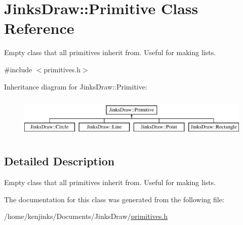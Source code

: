 \hypertarget{class_jinks_draw_1_1_primitive}{}\section{Jinks\+Draw\+:\+:Primitive Class Reference}
\label{class_jinks_draw_1_1_primitive}


Empty class that all primitives inherit from. Useful for making lists.  




{\ttfamily \#include $<$primitives.\+h$>$}

Inheritance diagram for Jinks\+Draw\+:\+:Primitive\+:\begin{figure}[H]
\begin{center}
\leavevmode
\includegraphics[height=1.985816cm]{class_jinks_draw_1_1_primitive}
\end{center}
\end{figure}


\subsection{Detailed Description}
Empty class that all primitives inherit from. Useful for making lists. 

The documentation for this class was generated from the following file\+:\begin{DoxyCompactItemize}
\item 
/home/kenjinks/\+Documents/\+Jinks\+Draw/\mbox{\hyperlink{primitives_8h}{primitives.\+h}}\end{DoxyCompactItemize}
